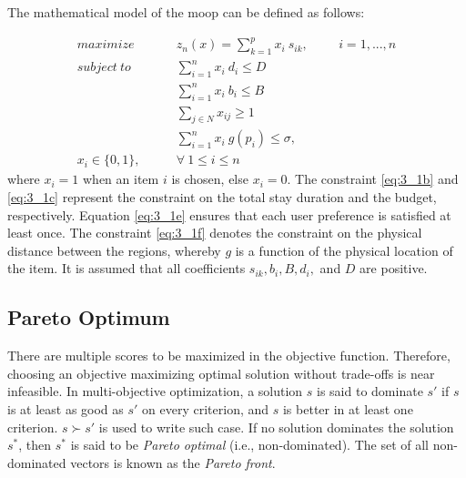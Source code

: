 The mathematical model of the \gls{moop} can be defined as follows:

\begin{align}
    \tag{1}maximize \qquad  &z_n(x) = \sum_{k=1}^p x_i\ s_{ik}, \hspace{1cm} i = 1,...,n \label{eq:3_1a}\\
    \tag{2}subject \ to \qquad &\sum_{i=1}^n x_i\ d_i  \leq D \label{eq:3_1b}\\
    \tag{3}&\sum_{i=1}^n x_i\ b_i \leq B \label{eq:3_1c}\\
    \tag{4}&\sum_{j \in N} x_{ij} \geq 1 \label{eq:3_1e}\\ 
    \tag{5}&\sum_{i=1}^n x_{i} \ g(p_i) \leq \sigma,  \hspace{1cm}  \label{eq:3_1f} \\
    \tag{7} x_i \in \{0,1\}, \qquad &\forall \ 1 \leq i \leq n
\end{align}
where $x_i = 1$ when an item $i$ is chosen, else $x_i = 0$. 
The constraint \ref{eq:3_1b} and \ref{eq:3_1c} represent the constraint on the total stay duration and the budget, respectively. Equation \ref{eq:3_1e} ensures that each user preference is satisfied at least once. The constraint \ref{eq:3_1f} denotes the constraint on the physical distance between the regions, whereby $g$ is a function of the physical location of the item. It is assumed that all coefficients $s_{ik}, b_{i}, B, d_i,$ and $D$ are positive. 

\subsection{Pareto Optimum}
There are multiple scores to be maximized in the objective function. Therefore, choosing an objective maximizing optimal solution without trade-offs is near infeasible. In multi-objective optimization, a solution $s$ is said to dominate $s'$ if $s$ is at least as good as $s'$ on every criterion, and $s$ is better in at least one criterion. $s \succ s'$ is used to write such case. If no solution dominates the solution $s^*$, then $s^*$ is said to be \textit{Pareto optimal} (i.e., non-dominated). The set of all non-dominated vectors is known as the \textit{Pareto front}.

